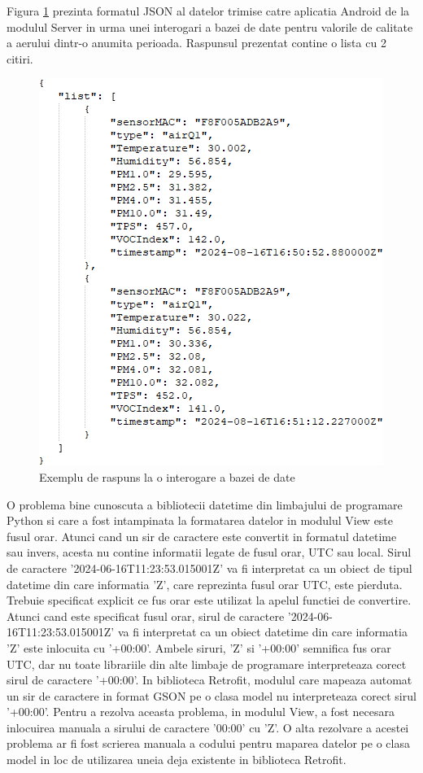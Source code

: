 Figura \ref{fig:Server2AndroidDataFormat} prezinta formatul JSON al datelor trimise catre aplicatia Android de la modulul Server in urma unei interogari a bazei de 
date pentru valorile de calitate a aerului dintr-o anumita perioada. Raspunsul prezentat contine o lista cu 2 citiri.
\begin{figure}[H]
    \centering
    \includegraphics[scale=0.7]{figs/Server2AndroidDataFormat.png}
    \caption{Exemplu de raspuns la o interogare a bazei de date}
    \label{fig:Server2AndroidDataFormat}
\end{figure}

O problema bine cunoscuta a bibliotecii datetime din limbajului de programare Python si care a fost intampinata la formatarea datelor in modulul View este fusul orar. 
Atunci cand un sir de caractere este convertit in formatul datetime sau invers, acesta nu contine informatii legate de fusul orar, UTC sau local. Sirul de caractere 
'2024-06-16T11:23:53.015001Z' va fi interpretat ca un obiect de tipul datetime din care informatia 'Z', care reprezinta fusul orar UTC, este pierduta. 
Trebuie specificat explicit ce fus orar este utilizat la apelul functiei de convertire. Atunci cand este specificat fusul orar, sirul de caractere 
'2024-06-16T11:23:53.015001Z' va fi interpretat ca un obiect datetime din care informatia 'Z' este inlocuita cu '+00:00'. Ambele siruri, 'Z' si '+00:00' semnifica fus orar 
UTC, dar nu toate librariile din alte limbaje de programare interpreteaza corect sirul de caractere '+00:00'. In biblioteca Retrofit, modulul care mapeaza automat un sir de 
caractere in format GSON pe o clasa model nu interpreteaza corect sirul '+00:00'. Pentru a rezolva aceasta problema, in modulul View, a fost necesara inlocuirea manuala a sirului 
de caractere '00:00' cu 'Z'. O alta rezolvare a acestei problema ar fi fost scrierea manuala a codului pentru maparea datelor pe o clasa model in loc de utilizarea uneia deja 
existente in biblioteca Retrofit. 

